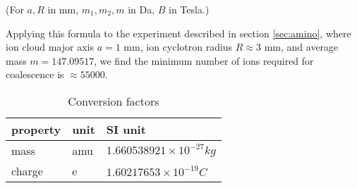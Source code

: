 \documentclass[10pt,conference,onecolumn]{IEEEtran}
\begin{document}
(For $a,R$ in mm, $m_1 ,m_2, m$ in Da, $B$ in Tesla.)

Applying this formula to the experiment described in section \ref{sec:amino}, where ion cloud major axis $a = 1$ mm, ion cyclotron radius $R \approx 3$ mm, and average mass $m = 147.09517$, we find the minimum number of ions required for coalescence is $\approx 55000$.

\begin{table}[htbp]
 \centering	  	  
 \caption{Conversion factors}
\label{tab:conversion}
\begin{tabular}{l|l|l}
\hline \hline
\textbf{property} & \textbf{unit} & \textbf{SI unit} \\
\hline
mass & amu & $1.660538921 \times 10^{ - 27} kg$ \\
charge & e   & $1.60217653 \times 10^{ - 19} C$ \\
\hline \hline
\end{tabular}
\end{table}



\end{document}

